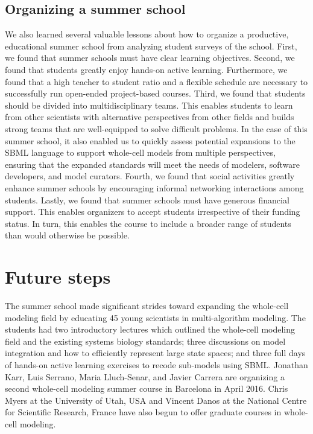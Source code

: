 \documentclass[journal,transmag]{IEEEtran}
\begin{document}
\subsection{Organizing a summer school}
We also learned several valuable lessons about how to organize a productive, educational summer school from analyzing student surveys of the school.
First, we found that summer schools must have clear learning objectives.
Second, we found that students greatly enjoy hands-on active learning. 
Furthermore, we found that a high teacher to student ratio and a flexible schedule are necessary to successfully run open-ended project-based courses.
Third, we found that students should be divided into multidisciplinary teams. 
This enables students to learn from other scientists with alternative perspectives from other fields and builds strong teams that are well-equipped to solve difficult problems.
In the case of this summer school, it also enabled us to quickly assess potential expansions to the SBML language to support whole-cell models from multiple perspectives, ensuring that the expanded standards will meet the needs of modelers, software developers, and model curators.
Fourth, we found that social activities greatly enhance summer schools by encouraging informal networking interactions among students.
Lastly, we found that summer schools must have generous financial support. This enables organizers to accept students irrespective of their funding status. In turn, this enables the course to include a broader range of students than would otherwise be possible.

\section{Future steps}

The summer school made significant strides toward expanding the whole-cell modeling field by educating 45 young scientists in multi-algorithm modeling. The students had two introductory lectures which outlined the whole-cell modeling field and the existing systems biology standards; three discussions on model integration and how to efficiently represent large state spaces; and three full days of hands-on active learning exercises to recode sub-models using SBML. Jonathan Karr, Luis Serrano, Maria Lluch-Senar, and Javier Carrera are organizing a second whole-cell modeling summer course in Barcelona in April 2016. Chris Myers at the University of Utah, USA and Vincent Danos at the National Centre for Scientific Research, France have also begun to offer graduate courses in whole-cell modeling.
\end{document}

